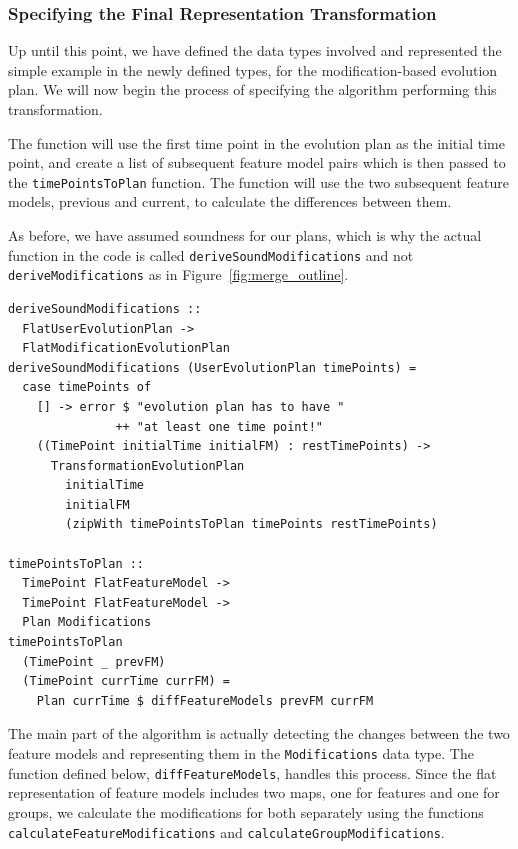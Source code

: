 \documentclass[a4paper,english]{ifimaster}
\begin{document}
\subsubsection{Specifying the Final Representation Transformation}%
\label{ssub:specifying_the_final_representation_transformation}

Up until this point, we have defined the data types involved and represented the simple example in the newly defined types, for the modification-based evolution plan. We will now begin the process of specifying the algorithm performing this transformation. 

The function will use the first time point in the evolution plan as the initial time point, and create a list of subsequent feature model pairs which is then passed to the \texttt{timePointsToPlan} function. The function will use the two subsequent feature models, previous and current, to calculate the differences between them.

As before, we have assumed soundness for our plans, which is why the actual function in the code is called \texttt{deriveSoundModifications} and not \texttt{deriveModifications} as in Figure~\ref{fig:merge_outline}.

\begin{verbatim}
deriveSoundModifications :: 
  FlatUserEvolutionPlan -> 
  FlatModificationEvolutionPlan
deriveSoundModifications (UserEvolutionPlan timePoints) = 
  case timePoints of
    [] -> error $ "evolution plan has to have " 
               ++ "at least one time point!"
    ((TimePoint initialTime initialFM) : restTimePoints) ->
      TransformationEvolutionPlan
        initialTime
        initialFM
        (zipWith timePointsToPlan timePoints restTimePoints)

timePointsToPlan ::
  TimePoint FlatFeatureModel -> 
  TimePoint FlatFeatureModel -> 
  Plan Modifications
timePointsToPlan 
  (TimePoint _ prevFM) 
  (TimePoint currTime currFM) =
    Plan currTime $ diffFeatureModels prevFM currFM
\end{verbatim}

The main part of the algorithm is actually detecting the changes between the two feature models and representing them in the \texttt{Modifications} data type. The function defined below, \texttt{diffFeatureModels}, handles this process. Since the flat representation of feature models includes two maps, one for features and one for groups, we calculate the modifications for both separately using the functions \texttt{calculateFeatureModifications} and \texttt{calculateGroupModifications}.
\end{document}
